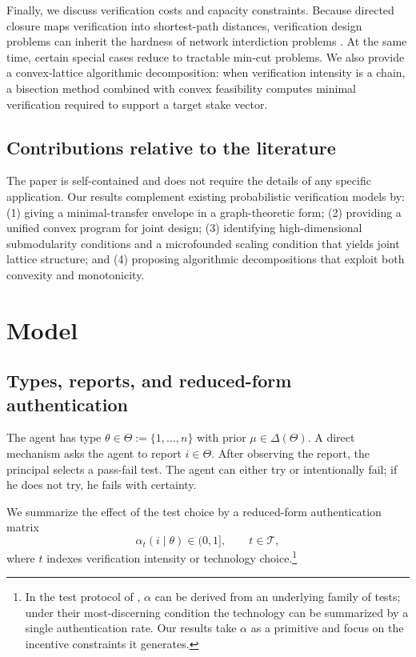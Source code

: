 \documentclass[final,3p,times]{elsarticle}
\theoremstyle{plain}
\theoremstyle{definition}
\newcommand{\1}{\mathbbm{1}}
\newcommand{\ThetaSet}{\Theta}
\newcommand{\cT}{\mathcal{T}}
\begin{document}
Finally, we discuss verification costs and capacity constraints. Because directed closure maps verification into shortest-path distances, verification design problems can inherit the hardness of network interdiction problems \citep{KhachiyanEtAl2008}. At the same time, certain special cases reduce to tractable min-cut problems. We also provide a convex-lattice algorithmic decomposition: when verification intensity is a chain, a bisection method combined with convex feasibility computes minimal verification required to support a target stake vector.

\subsection*{Contributions relative to the literature}

The paper is self-contained and does not require the details of any specific application. Our results complement existing probabilistic verification models by: 
(1) giving a minimal-transfer envelope in a graph-theoretic form; 
(2) providing a unified convex program for joint design; 
(3) identifying high-dimensional submodularity conditions and a microfounded scaling condition that yields joint lattice structure; and 
(4) proposing algorithmic decompositions that exploit both convexity and monotonicity.

\section{Model}

\subsection{Types, reports, and reduced-form authentication}

The agent has type $\theta\in\ThetaSet:=\{1,\dots,n\}$ with prior $\mu\in\Delta(\ThetaSet)$. A direct mechanism asks the agent to report $i\in\ThetaSet$. After observing the report, the principal selects a pass-fail test. The agent can either try or intentionally fail; if he does not try, he fails with certainty.

We summarize the effect of the test choice by a reduced-form authentication matrix
\[
\alpha_t(i\mid \theta)\in(0,1],\qquad t\in\cT,
\]
where $t$ indexes verification intensity or technology choice.\footnote{In the test protocol of \citet{BallKattwinkel2025}, $\alpha$ can be derived from an underlying family of tests; under their most-discerning condition the technology can be summarized by a single authentication rate. Our results take $\alpha$ as a primitive and focus on the incentive constraints it generates.}
\end{document}
